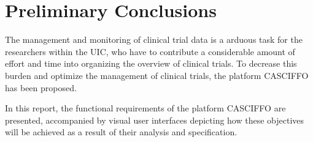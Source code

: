 \chapter{Preliminary Conclusions}
The management and monitoring of clinical trial data is a arduous task for the researchers within the UIC, who have to contribute a considerable amount of effort and time into organizing the overview of clinical trials. To decrease this burden and optimize the management of clinical trials, the platform CASCIFFO has been proposed.

In this report, the functional requirements of the platform CASCIFFO are presented, accompanied by visual user interfaces depicting how these objectives will be achieved as a result of their analysis and specification.